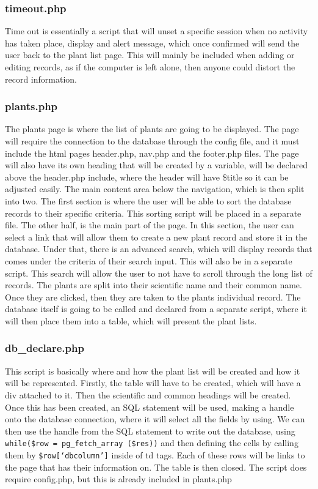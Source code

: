	\subsubsection{timeout.php}
		Time out is essentially a script that will unset a specific session when no activity has taken place, display and alert message, which once confirmed will send the user back to the plant list page. This will mainly be included when adding or editing records, as if the computer is left alone, then anyone could distort the record information.

	\subsubsection{plants.php}
		The plants page is where the list of plants are going to be displayed. The page will require the connection to the database through the config file, and it must include the html pages header.php, nav.php and the footer.php files.  The page will also have its own heading that will be created by a variable, will be declared above the header.php include, where the header will have \$title so it can be adjusted easily. The main content area below the navigation, which is then split into two. The first section is where the user will be able to sort the database records to their specific criteria. This sorting script will be placed in a separate file. The other half, is the main part of the page. In this section, the user can select a link that will allow them to create a new plant record and store it in the database. Under that, there is an advanced search, which will display records that comes under the criteria of their search input. This will also be in a separate script. This search will allow the user to not have to scroll through the long list of records. The plants are split into their scientific name and their common name. Once they are clicked, then they are taken to the plants individual record. The database itself is going to be called and declared from a separate script, where it will then place them into a table, which will present the plant lists.

	\subsubsection{db\_declare.php}
	This script is basically where and how the plant list will be created and how it will be represented. Firstly, the table will have to be created, which will have a div attached to it. Then the scientific and common headings will be created. Once this has been created, an SQL statement will be used, making a handle onto the database connection, where it will select all the fields by using.  We can then use the handle from the SQL statement to write out the database, using \texttt{while(\$row = pg\_fetch\_array (\$res))} and then defining the cells by calling them by \texttt{\$row[`dbcolumn']} inside of td tags.  Each of these rows will be links to the page that has their information on. The table is then closed. The script does require config.php, but this is already included in plants.php

